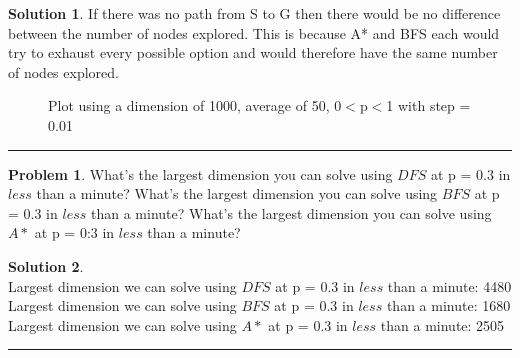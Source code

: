 \documentclass{article}
\theoremstyle{definition}
\newtheorem{problem}{Problem}
\def\fline{\rule{0.75\linewidth}{0.5pt}}
\newcommand{\finishline}{\vspace{-15pt}\begin{center}\fline\end{center}}
\newtheorem*{solution*}{Solution}
\newenvironment{solution}{\begin{solution*}}{{\finishline} \end{solution*}}
\begin{document}
\begin{solution}
    If there was no path from S to G then there would be no difference between the number of nodes explored. This is because A* and BFS each would try to exhaust every possible option and would therefore have the same number of nodes explored.
    
	\begin{figure}[h]
	\centering
	\caption{Plot using a dimension of 1000, average of 50, 0$<$p$<$1 with step = 0.01}
	\end{figure}
	
\end{solution}

\smallskip

\begin{problem}
	What's the largest dimension you can solve using $DFS$ at p = 0.3 in $less$ than a minute? What's the largest dimension you can solve using $BFS$ at p = 0.3 in $less$ than a minute? What's the largest dimension you can solve using $A*$ at p = 0:3 in $less$ than a minute?  
\end{problem}

\smallskip

\begin{solution} \hfill \\
	Largest dimension we can solve using $DFS$ at p = 0.3 in $less$ than a minute: 4480\\
	Largest dimension we can solve using $BFS$ at p = 0.3 in $less$ than a minute: 1680\\
	Largest dimension we can solve using $A*$ at p = 0.3 in $less$ than a minute: 2505\\
\end{solution}
\end{document}
